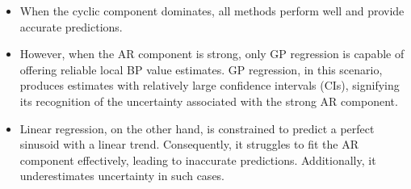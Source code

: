 \begin{itemize}
    \item When the cyclic component dominates, all methods perform well and provide accurate predictions.
    \item However, when the AR component is strong, only GP regression is capable of offering reliable
    local BP value estimates. GP regression, in this scenario, produces estimates with relatively
    large confidence intervals (CIs), signifying its recognition of the uncertainty associated with the strong AR component.
    \item Linear regression, on the other hand, is constrained
    to predict a perfect sinusoid with a linear trend.
    Consequently, it struggles to fit the AR component effectively, leading to inaccurate predictions.
    Additionally, it underestimates uncertainty in such cases.
\end{itemize}


